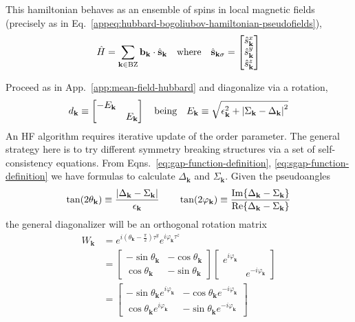 This hamiltonian behaves as an ensemble of spins in local magnetic fields (precisely as in Eq.~\eqref{appeq:hubbard-bogoliubov-hamiltonian-pseudofields}),
\begin{equation}\label{eq:extended-hubbard-bogoliubov-hamiltonian-pseudofields}
	\hat H = \sum_{\mathbf{k} \in \mathrm{BZ}} \mathbf{b}_\mathbf{k} \cdot \hat{\mathbf{s}}_\mathbf{k}
	\qq{where}
	\hat{\mathbf{s}}_{\mathbf{k}\sigma} = \begin{bmatrix}
		\hat s_\mathbf{k}^x \\
		\hat s_\mathbf{k}^y \\
		\hat s_\mathbf{k}^z
	\end{bmatrix}
\end{equation}

Proceed as in App.~\ref{app:mean-field-hubbard} and diagonalize via a rotation,
\[
	d_\mathbf{k} \equiv \begin{bmatrix}
		-E_\mathbf{k} & \\ & E_\mathbf{k}
	\end{bmatrix}
	\qq{being}
	E_\mathbf{k} \equiv \sqrt{\epsilon_\mathbf{k}^2 + \abs{\Sigma_\mathbf{k} - \Delta_\mathbf{k}}^2}
\]
An HF algorithm requires iterative update of the order parameter. The general strategy here is to try different symmetry breaking structures via a set of self-consistency equations. From Eqns.~\eqref{eq:gap-function-definition}, \eqref{eq:sgap-function-definition} we have formulas to calculate $\Delta_\mathbf{k}$ and $\Sigma_\mathbf{k}$. Given the pseudoangles
\[
	\tan(2\theta_\mathbf{k}) \equiv \frac{\abs{\Delta_\mathbf{k}-\Sigma_\mathbf{k}}}{\epsilon_\mathbf{k}}
	\qquad
	\tan(2\varphi_\mathbf{k}) \equiv \frac{\Im{\Delta_\mathbf{k}-\Sigma_\mathbf{k}}}{\Re{\Delta_\mathbf{k}-\Sigma_\mathbf{k}}}
\]
the general diagonalizer will be an orthogonal rotation matrix
\[
\begin{aligned}
	W_\mathbf{k} &= e^{i \left(\theta_\mathbf{k} - \frac{\pi}{2}\right) \tau^y} e^{i \varphi_\mathbf{k} \tau^z} \\
	&= \begin{bmatrix}
		-\sin\theta_\mathbf{k}  & -\cos\theta_\mathbf{k}  \\ 
		\cos\theta_\mathbf{k}  & -\sin\theta_\mathbf{k} 
	\end{bmatrix} \begin{bmatrix}
		e^{i\varphi_\mathbf{k} } & \\ & e^{-i\varphi_\mathbf{k} }
	\end{bmatrix} \\
	&= \begin{bmatrix}
		-\sin\theta_\mathbf{k}  e^{i\varphi_\mathbf{k} } & -\cos\theta_\mathbf{k}  e^{-i\varphi_\mathbf{k} }  \\ 
		\cos\theta_\mathbf{k}  e^{i\varphi_\mathbf{k} } & -\sin\theta_\mathbf{k}  e^{-i\varphi_\mathbf{k} } 
	\end{bmatrix}
\end{aligned}
\]
